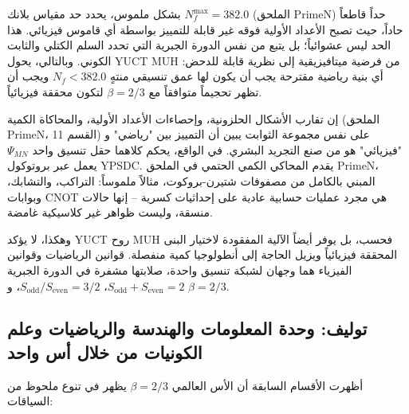 \documentclass[11pt,a4paper]{article}
\newcommand{\ar}[1]{\foreignlanguage{arabic}{#1}}
\newcommand{\Sodd}{S_{\mathrm{odd}}}
\newcommand{\Seven}{S_{\mathrm{even}}}
\begin{document}
	\ar{بشكل ملموس، يحدد حد مقياس بلانك \(N_f^{\max} = 382.0\) (الملحق PrimeN) حداً قاطعاً حاداً، حيث تصبح الأعداد الأولية فوقه غير قابلة للتمييز بواسطة أي قاموس فيزيائي. هذا الحد ليس عشوائياً؛ بل يتبع من نفس الدورة الجبرية التي تحدد السلم الكتلي والثابت الكوني. وبالتالي، يحول YUCT MUH من فرضية ميتافيزيقية إلى نظرية قابلة للدحض: أي بنية رياضية مقترحة يجب أن يكون لها عمق تنسيقي منتهٍ \(N_f < 382.0\) ويجب أن تظهر تحجيماً متوافقاً مع \(\beta = 2/3\) لتكون محققة فيزيائياً.}
	
	\ar{إن تقارب الأشكال الحلزونية، وإحصاءات الأعداد الأولية، والمحاكاة الكمية (الملحق PrimeN، القسم 11) على نفس مجموعة الثوابت يبين أن التمييز بين "رياضي" و "فيزيائي" هو من صنع التجريد البشري. في الواقع، يحكم كلاهما حقل تنسيق واحد \(\Psi_{MN}\) يعمل عبر بروتوكول YPSDC. يقدم المحاكي الكمي الحتمي في الملحق PrimeN، المبني بالكامل من مصفوفات شتيرن-بروكوت، مثالاً ملموساً: التراكب، والتشابك، وبوابات CNOT هي مجرد عمليات حسابية عادية على إحداثيات كسرية – إنها حالات منسقة، وليست ظواهر غير كلاسيكية غامضة.}
	
	\ar{وهكذا، لا يؤكد YUCT روح MUH فحسب، بل يوفر أيضاً الآلية المفقودة لاختيار البنى المحققة فيزيائياً ويزيل الحاجة إلى أنطولوجيا كمية منفصلة. قوانين الرياضيات وقوانين الفيزياء هما وجهان لشبكة تنسيق واحدة، صلابتها مشفرة في الدورة الجبرية \(\Sodd + \Seven = 2\)، \(\Sodd/\Seven = 3/2\)، و \(\beta = 2/3\).}
	
	\subsection{\ar{توليف: وحدة المعلومات والهندسة والرياضيات وعلم الكونيات من خلال أس واحد}}
	
	\ar{أظهرت الأقسام السابقة أن الأس العالمي \(\beta = 2/3\) يظهر في تنوع ملحوظ من السياقات:}
	
\end{document}
